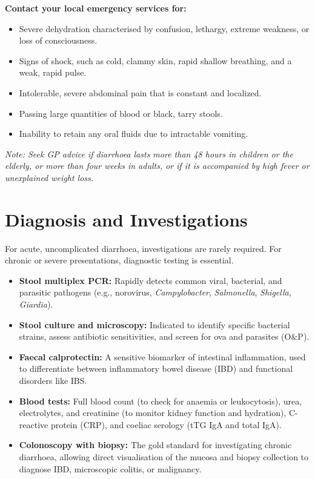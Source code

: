 \textbf{Contact your local emergency services for:}
\begin{itemize}
    \item Severe dehydration characterised by confusion, lethargy, extreme weakness, or loss of consciousness.
    \item Signs of shock, such as cold, clammy skin, rapid shallow breathing, and a weak, rapid pulse.
    \item Intolerable, severe abdominal pain that is constant and localized.
    \item Passing large quantities of blood or black, tarry stools.
    \item Inability to retain any oral fluids due to intractable vomiting.
\end{itemize}
\textit{Note: Seek GP advice if diarrhoea lasts more than 48 hours in children or the elderly, or more than four weeks in adults, or if it is accompanied by high fever or unexplained weight loss.}

\section*{Diagnosis and Investigations}
For acute, uncomplicated diarrhoea, investigations are rarely required. For chronic or severe presentations, diagnostic testing is essential.
\begin{itemize}
    \item \textbf{Stool multiplex PCR:} Rapidly detects common viral, bacterial, and parasitic pathogens (e.g., norovirus, \textit{Campylobacter}, \textit{Salmonella}, \textit{Shigella}, \textit{Giardia}).
    \item \textbf{Stool culture and microscopy:} Indicated to identify specific bacterial strains, assess antibiotic sensitivities, and screen for ova and parasites (O\&P).
    \item \textbf{Faecal calprotectin:} A sensitive biomarker of intestinal inflammation, used to differentiate between inflammatory bowel disease (IBD) and functional disorders like IBS.
    \item \textbf{Blood tests:} Full blood count (to check for anaemia or leukocytosis), urea, electrolytes, and creatinine (to monitor kidney function and hydration), C-reactive protein (CRP), and coeliac serology (tTG IgA and total IgA).
    \item \textbf{Colonoscopy with biopsy:} The gold standard for investigating chronic diarrhoea, allowing direct visualisation of the mucosa and biopsy collection to diagnose IBD, microscopic colitis, or malignancy.
\end{itemize}

